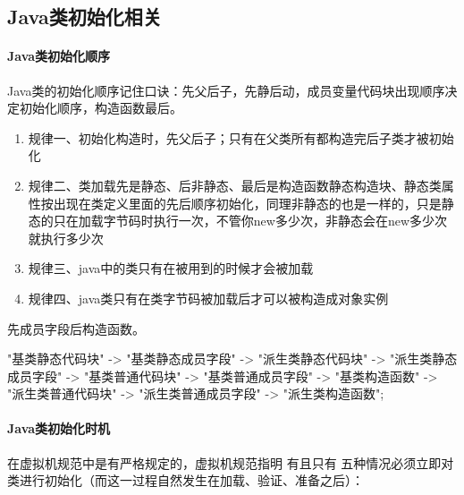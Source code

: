 \documentclass[../../../interview-questions.tex]{subfiles}
\begin{document}
\subsection{Java类初始化相关}

\paragraph{Java类初始化顺序}

Java类的初始化顺序记住口诀：先父后子，先静后动，成员变量代码块出现顺序决定初始化顺序，构造函数最后。

\begin{enumerate}
\item{规律一、初始化构造时，先父后子；只有在父类所有都构造完后子类才被初始化}
\item{规律二、类加载先是静态、后非静态、最后是构造函数}静态构造块、静态类属性按出现在类定义里面的先后顺序初始化，同理非静态的也是一样的，只是静态的只在加载字节码时执行一次，不管你new多少次，非静态会在new多少次就执行多少次
\item{规律三、java中的类只有在被用到的时候才会被加载}
\item{规律四、java类只有在类字节码被加载后才可以被构造成对象实例}
\end{enumerate}

先成员字段后构造函数。

"基类静态代码块" -> "基类静态成员字段" -> "派生类静态代码块"
    -> "派生类静态成员字段" -> "基类普通代码块" -> "基类普通成员字段"
    -> "基类构造函数" -> "派生类普通代码块"
    -> "派生类普通成员字段" -> "派生类构造函数";

\paragraph{Java类初始化时机}
    
在虚拟机规范中是有严格规定的，虚拟机规范指明 有且只有 五种情况必须立即对类进行初始化（而这一过程自然发生在加载、验证、准备之后）：
\end{document}
